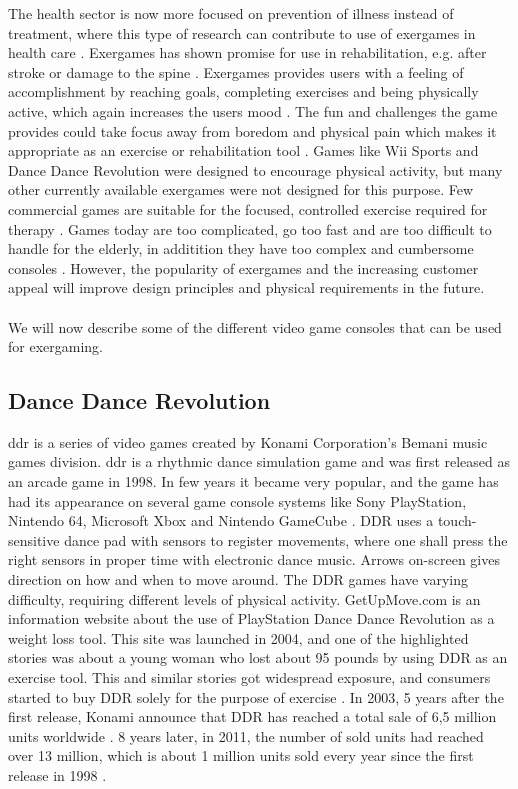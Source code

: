 The health sector is now more focused on prevention of illness instead of treatment, where this type of research can contribute to use of exergames in health care \cite{gamingforhealth}. Exergames has shown promise for use in rehabilitation, e.g. after stroke or damage to the spine \cite{lange2011development}. Exergames provides users with a feeling of accomplishment by reaching goals, completing exercises and being physically active, which again increases the users mood \cite{staiano2011exergames}. The fun and challenges the game provides could take focus away from boredom and physical pain which makes it appropriate as an exercise or rehabilitation tool \cite{exergamesforelderly}. Games like Wii Sports and Dance Dance Revolution were designed to encourage physical activity, but many other currently available exergames were not designed for this purpose. Few commercial games are suitable for the focused, controlled exercise required for therapy \cite{lange2011development}. Games today are too complicated, go too fast and are too difficult to handle for the elderly, in additition they have too complex and cumbersome consoles \cite{exergamesforelderly}. However, the popularity of exergames and the increasing customer appeal will improve design principles and physical requirements in the future\cite{chamberlin2008exergames}. \\ \\
We will now describe some of the different video game consoles that can be used for exergaming.
\subsection{Dance Dance Revolution}
\ac{ddr} is a series of video games created by Konami Corporation’s Bemani music games division. \ac{ddr} is a rhythmic dance simulation game and was first released as an arcade game in 1998. In few years it became very popular, and the game has had its appearance on several game console systems like Sony PlayStation, Nintendo 64, Microsoft Xbox and Nintendo GameCube \cite{bogost2005rhetoric}. DDR uses a touch-sensitive dance pad with sensors to register movements, where one shall press the right sensors in proper time with electronic dance music. Arrows on-screen gives direction on how and when to move around. The DDR games have varying difficulty, requiring different levels of physical activity. GetUpMove.com is an information website about the use of PlayStation Dance Dance Revolution as a weight loss tool. This site was launched in 2004, and one of the highlighted stories was about a young woman who lost about 95 pounds by using DDR as an exercise tool. This and similar stories got widespread exposure, and consumers started to buy DDR solely for the purpose of exercise \cite{bogost2005rhetoric}. In 2003, 5 years after the first release, Konami announce that DDR has reached a total sale of 6,5 million units worldwide \cite{gamespot}. 8 years later, in 2011, the number of sold units had reached over 13 million, which is  about 1 million units sold every year since the first release in 1998 \cite{gaygamer}. 

